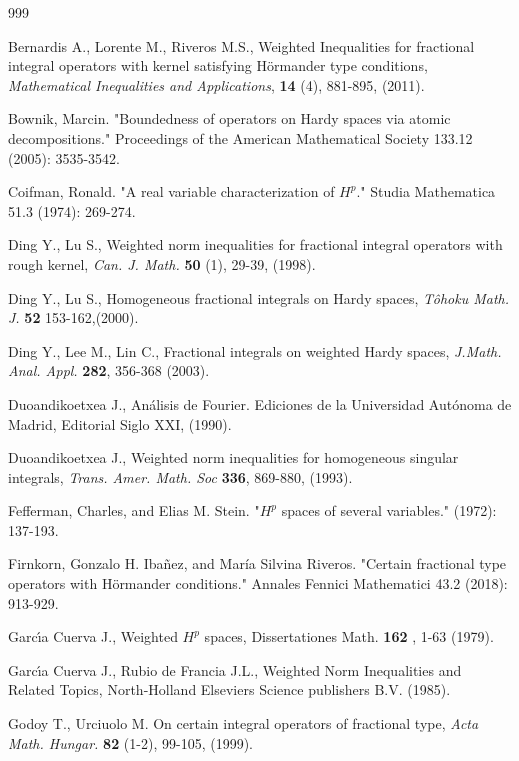 \documentclass[a4paper,12pt,reqno]{amsart}
\numberwithin{equation}{section}
\begin{document}
	
	\begin{thebibliography}{999}
		\parskip=0.1cm
		
		  Bernardis A., Lorente M.,  Riveros M.S.,  Weighted Inequalities for fractional integral operators with kernel satisfying H\"{o}rmander type conditions,  \emph{ Mathematical Inequalities and Applications},
		\textbf{14} (4), 881-895, (2011).
		
		 Bownik, Marcin. "Boundedness of operators on Hardy spaces via atomic decompositions." Proceedings of the American Mathematical Society 133.12 (2005): 3535-3542.
		
		 Coifman, Ronald. "A real variable characterization of $ H^{p} $." Studia Mathematica 51.3 (1974): 269-274.
		
		 Ding Y., Lu S., Weighted norm inequalities for fractional integral operators with rough kernel, \emph{Can. J. Math.} \textbf{50} (1), 29-39, (1998).
		
		 Ding Y., Lu S., Homogeneous fractional integrals on Hardy spaces,  \emph{T\^{o}hoku Math. J.}  \textbf{52} 153-162,(2000).
		
		 Ding Y.,  Lee M., Lin C.,  Fractional integrals on weighted Hardy spaces,  \emph{J.Math. Anal.  Appl.} \textbf{282}, 356-368 (2003).
		
		 Duoandikoetxea J., An\'{a}lisis de Fourier. Ediciones de la
		Universidad Aut\'{o}noma de Madrid, Editorial Siglo XXI, (1990).
		
		 Duoandikoetxea J., Weighted norm inequalities for homogeneous singular integrals, \emph{Trans. Amer. Math. Soc} \textbf{336}, 869-880, (1993).
		
		 Fefferman, Charles, and Elias M. Stein. "$H^p$ spaces of several variables." (1972): 137-193.
		
		 Firnkorn, Gonzalo H. Ibañez, and María Silvina Riveros. "Certain fractional type operators with Hörmander conditions." Annales Fennici Mathematici 43.2 (2018): 913-929.
		
		 Garc\'{\i}a Cuerva J., Weighted $H^p$ spaces,  Dissertationes Math.\textbf{ 162 }, 1-63 (1979).
		
		 Garc\'{\i}a Cuerva J., Rubio de Francia J.L., Weighted Norm Inequalities and Related Topics, North-Holland Elseviers Science publishers B.V. (1985).
		
		
		
		 Godoy T., Urciuolo M. On certain integral operators of
		fractional type, \emph{ Acta Math. Hungar.} \textbf{82} (1-2), 99-105, (1999).
		

\end{thebibliography}
\end{document}
